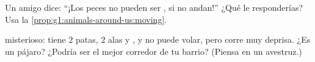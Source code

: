 \begin{exercise}[$\star\star$]\label{exo:g1:animals-around-us:9}
Un amigo dice: ``¡Los peces no pueden ser , si no andan!''
¿Qué le responderías? Usa la \cref{prop:g1:animals-around-us:moving}.
\end{exercise}

\begin{exercise}[$\star\star$]\label{exo:g1:animals-around-us:10}
 misterioso: tiene $2$ patas, $2$ alas y , y no puede
volar, pero corre muy deprisa. ¿Es un pájaro? ¿Podría ser el mejor
corredor de tu barrio? (Piensa en un avestruz.)
\end{exercise}

